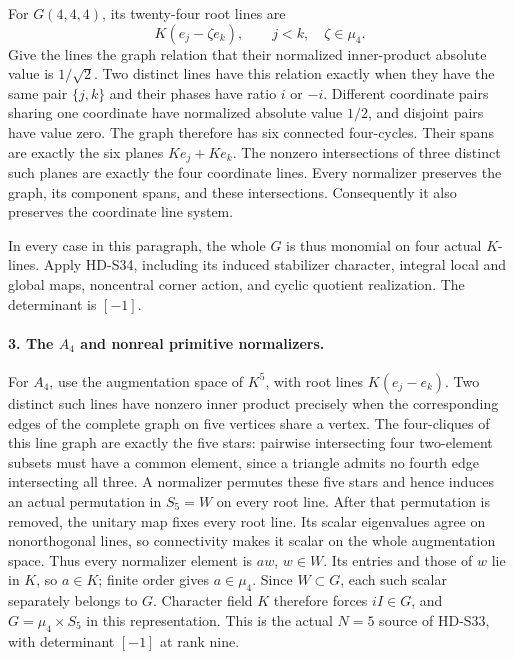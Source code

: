 For \(G(4,4,4)\), its twenty-four root lines are
\[
           K(e_j-\zeta e_k),\qquad j<k,\quad\zeta\in\mu_4.
\]
Give the lines the graph relation that their normalized inner-product
absolute value is \(1/\sqrt2\). Two distinct lines have this relation
exactly when they have the same pair \(\{j,k\}\) and their phases
have ratio \(i\) or \(-i\). Different coordinate pairs sharing one
coordinate have normalized absolute value \(1/2\), and disjoint
pairs have value zero. The graph therefore has six connected
four-cycles. Their spans are exactly the six planes
\(Ke_j+Ke_k\). The nonzero intersections of three distinct such
planes are exactly the four coordinate lines. Every normalizer
preserves the graph, its component spans, and these intersections.
Consequently it also preserves the coordinate line system.

In every case in this paragraph, the whole \(G\) is thus monomial
on four actual \(K\)-lines. Apply HD-S34, including its induced
stabilizer character, integral local and global maps, noncentral
corner action, and cyclic quotient realization. The determinant
is \([-1]\).

\paragraph{3. The \(A_4\) and nonreal primitive normalizers.}
For \(A_4\), use the augmentation space of \(K^5\), with root
lines \(K(e_j-e_k)\). Two distinct such lines have nonzero inner
product precisely when the corresponding edges of the complete graph
on five vertices share a vertex. The four-cliques of this line graph
are exactly the five stars: pairwise intersecting four two-element
subsets must have a common element, since a triangle admits no fourth
edge intersecting all three. A normalizer permutes these five stars
and hence induces an actual permutation in \(S_5=W\) on every
root line. After that permutation is removed, the unitary map fixes
every root line. Its scalar eigenvalues agree on nonorthogonal lines,
so connectivity makes it scalar on the whole augmentation space.
Thus every normalizer element is \(aw\), \(w\in W\).
Its entries and those of \(w\) lie in \(K\), so \(a\in K\);
finite order gives \(a\in\mu_4\). Since \(W\subset G\), each
such scalar separately belongs to \(G\). Character field \(K\)
therefore forces \(iI\in G\), and
\(G=\mu_4\times S_5\) in this representation. This is the actual
\(N=5\) source of HD-S33, with determinant \([-1]\) at rank nine.


